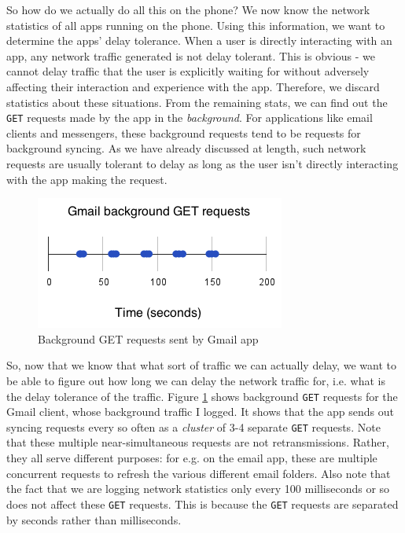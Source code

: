 \documentclass[12pt, fleqn]{article}
\begin{document}
So how do we actually do all this on the phone? 
We now know the network statistics of all apps running on the phone. Using this 
information, we want to determine the apps' delay tolerance.  When a user is 
directly interacting with an app, any network traffic generated is not delay 
tolerant. This is obvious - we cannot delay traffic that the user is explicitly
waiting for without adversely affecting their interaction and experience with the app. 
Therefore, we discard statistics about these situations. From the 
remaining stats, we can find out the \texttt{GET} requests made by the app in the 
\emph{background}. For applications like email clients and messengers, these 
background requests tend to be requests for background syncing. As we have 
already discussed at length, such network requests are usually tolerant to delay 
as long as the user isn't directly interacting with the app making the request. 

\medskip
\begin{figure}[htp]
\centering
\includegraphics[scale=1.0]{img/dt-get-req-gmail.png}
\caption{Background GET requests sent by Gmail app \label{fig-dt-get-req-gmail}}
\end{figure}
\medskip

So, now that we know that what sort of traffic we can actually delay, we want to be able to figure
out how long we can delay the network traffic for, i.e. what is the delay tolerance of the traffic. 
Figure \ref{fig-dt-get-req-gmail} shows background \texttt{GET} requests for the 
Gmail client, whose background traffic I logged. It shows that the app 
sends out syncing requests every so often as a \emph{cluster} of 3-4 separate \texttt{GET} requests. 
Note that these multiple near-simultaneous requests are not retransmissions. Rather, they all serve
different purposes: for e.g. on the email app, these are multiple concurrent requests 
to refresh the various different email folders. Also note that the fact that we 
are logging network statistics only every 100 milliseconds or so does not affect 
these \texttt{GET} requests. This is because the \texttt{GET} requests are separated by seconds 
rather than milliseconds.
\end{document}
